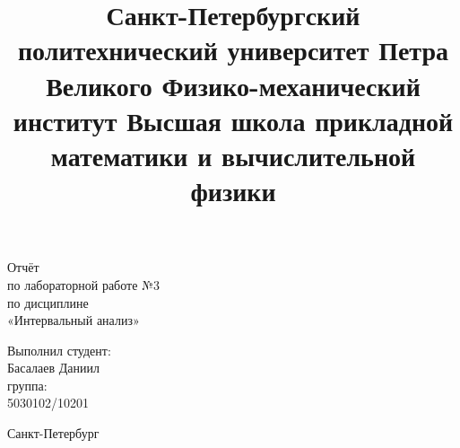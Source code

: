 \documentclass[a4paper,12pt]{article}
\title{Санкт-Петербургский политехнический университет
Петра Великого
Физико-механический институт
Высшая школа прикладной математики и вычислительной
физики}
\date{}
\begin{document}
\maketitle
\begin{center}
{\fontsize{25}{}\selectfont Отчёт \\
по лабораторной работе №3 \\
по дисциплине \\
«Интервальный анализ»}

\end{center}
\begin{flushright}
Выполнил студент:\\
Басалаев Даниил \\
группа:\\
5030102/10201\\

\end{flushright}

\vspace*{\fill} \begin{center}Санкт-Петербург\end{center}

\newpage %
\tableofcontents
\newpage
\end{document}

